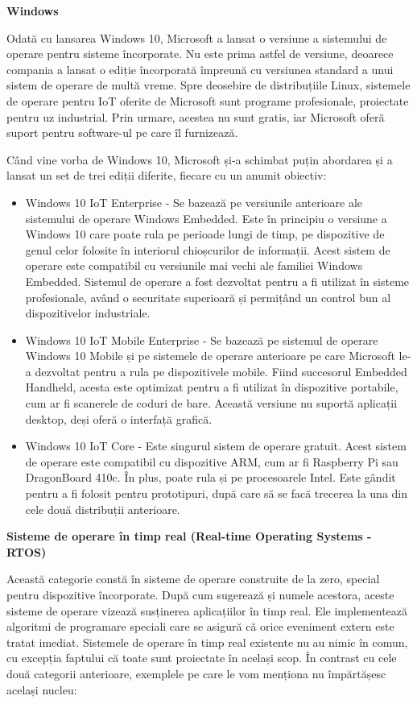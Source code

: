 \textbf{Windows}

Odată cu lansarea Windows 10, Microsoft a lansat o versiune a sistemului de
operare pentru sisteme încorporate. Nu este prima astfel de versiune, deoarece
compania a lansat o ediție încorporată împreună cu versiunea standard a unui
sistem de operare de multă vreme. Spre deosebire de distribuțiile Linux,
sistemele de operare pentru IoT oferite de Microsoft sunt programe profesionale,
proiectate pentru uz industrial. Prin urmare, acestea nu sunt gratis, iar
Microsoft oferă suport pentru software-ul pe care îl furnizează.

Când vine vorba de Windows 10, Microsoft și-a schimbat puțin abordarea și a
lansat un set de trei ediții diferite, fiecare cu un anumit obiectiv:

\begin{itemize}
	\item Windows 10 IoT Enterprise - Se bazează pe versiunile anterioare
		ale sistemului de operare Windows Embedded. Este în principiu o
		versiune a Windows 10 care poate rula pe perioade lungi de timp,
		pe dispozitive de genul celor folosite în interiorul
		chioșcurilor de informații. Acest sistem de operare este
		compatibil cu versiunile mai vechi ale familiei Windows
		Embedded. Sistemul de operare a fost dezvoltat pentru a fi
		utilizat în sisteme profesionale, având o securitate superioară
		și permițând un control bun al dispozitivelor industriale.
	\item Windows 10 IoT Mobile Enterprise - Se bazează pe sistemul de
		operare Windows 10 Mobile și pe sistemele de operare anterioare
		pe care Microsoft le-a dezvoltat pentru a rula pe dispozitivele
		mobile. Fiind succesorul Embedded Handheld, acesta este
		optimizat pentru a fi utilizat în dispozitive portabile, cum ar
		fi scanerele de coduri de bare. Această versiune nu suportă
		aplicații desktop, deși oferă o interfață grafică.
	\item Windows 10 IoT Core - Este singurul sistem de operare gratuit.
		Acest sistem de operare este compatibil cu dispozitive ARM, cum
		ar fi Raspberry Pi sau DragonBoard 410c. În plus, poate rula și
		pe procesoarele Intel. Este gândit pentru a fi folosit pentru
		prototipuri, după care să se facă trecerea la una din cele două
		distribuții anterioare.
\end{itemize}

\textbf{Sisteme de operare în timp real (Real-time Operating Systems - RTOS)}

Această categorie constă în sisteme de operare construite de la zero, special
pentru dispozitive încorporate. După cum sugerează și numele acestora, aceste
sisteme de operare vizează susținerea aplicațiilor în timp real. Ele
implementează algoritmi de programare speciali care se asigură că orice
eveniment extern este tratat imediat. Sistemele de operare în timp real existente
nu au nimic în comun, cu excepția faptului că toate sunt proiectate în același
scop. În contrast cu cele două categorii anterioare, exemplele pe care le vom
menționa nu împărtășesc același nucleu:

